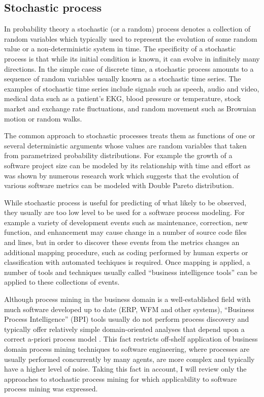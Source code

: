 \subsection{Stochastic process}
In probability theory a stochastic (or a random) process denotes a collection of random variables which typically used
to represent the evolution of some random value or a non-deterministic system in time. The specificity of a stochastic 
process is that while its initial condition is known, it can evolve in infinitely many directions. 
In the simple case of discrete time, a stochastic process amounts to a sequence of random variables usually known as 
a stochastic time series. 
The examples of stochastic time series include signals such as speech, audio and video, medical data such as a 
patient's EKG, blood pressure or temperature, stock market and exchange rate fluctuations, and random movement 
such as Brownian motion or random walks.

The common approach to stochastic processes treats them as functions of one or several deterministic arguments whose 
values are random variables that taken from parametrized probability distributions. For example the growth of a software 
project size can be modeled by its relationship with time and effort as was shown by numerous research work 
\cite{citeulike:330266} \cite{citeulike:12849755} \cite{citeulike:12849753} \cite{citeulike:328047} \cite{citeulike:12849771}
which suggests that the evolution of various software metrics can be modeled with Double Pareto distribution.

While stochastic process is useful for predicting of what likely to be observed, they usually are too low level to be used for
a software process modeling. For example a variety of development events such as maintenance, correction, new function,
and enhancement may cause change in a number of source code files and lines, but in order to discover these events 
from the metrics changes an additional mapping procedure, such as coding performed by human experts or classification 
with automated techiques is required. Once mapping is applied, a number of tools and techniques usually called ``business 
intelligence tools'' can be applied to these collections of events.

Although process mining in the business domain is a well-established field with much software developed up to date 
(ERP, WFM and other systems), ``Business Process Intelligence'' (BPI) tools usually do not perform process discovery and 
typically offer relatively simple domain-oriented analyses that depend upon a correct a-priori process model 
\cite{citeulike:3718014} \cite{citeulike:5044991}. 
This fact restricts off-shelf application of business domain process mining techniques to software engineering, where 
processes are usually performed concurrently by many agents, are more complex and typically have a higher level of noise. 
Taking this fact in account, I will review only the approaches to stochastic process mining for which applicability to software 
process mining was expressed. 

